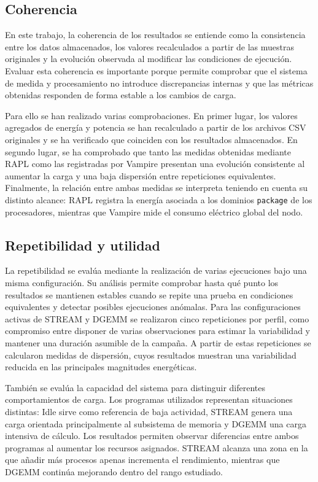 \subsection{Coherencia}

En este trabajo, la coherencia de los resultados se entiende como la consistencia entre los datos almacenados, los valores recalculados a partir de las muestras originales y la evolución observada al modificar las condiciones de ejecución. Evaluar esta coherencia es importante porque permite comprobar que el sistema de medida y procesamiento no introduce discrepancias internas y que las métricas obtenidas responden de forma estable a los cambios de carga.

Para ello se han realizado varias comprobaciones. En primer lugar, los valores agregados de energía y potencia se han recalculado a partir de los archivos CSV originales y se ha verificado que coinciden con los resultados almacenados. En segundo lugar, se ha comprobado que tanto las medidas obtenidas mediante RAPL como las registradas por Vampire presentan una evolución consistente al aumentar la carga y una baja dispersión entre repeticiones equivalentes. Finalmente, la relación entre ambas medidas se interpreta teniendo en cuenta su distinto alcance: RAPL registra la energía asociada a los dominios \texttt{package} de los procesadores, mientras que Vampire mide el consumo eléctrico global del nodo.

\subsection{Repetibilidad y utilidad}

La repetibilidad se evalúa mediante la realización de varias ejecuciones bajo una misma configuración. Su análisis permite comprobar hasta qué punto los resultados se mantienen estables cuando se repite una prueba en condiciones equivalentes y detectar posibles ejecuciones anómalas. Para las configuraciones activas de STREAM y DGEMM se realizaron cinco repeticiones por perfil, como compromiso entre disponer de varias observaciones para estimar la variabilidad y mantener una duración asumible de la campaña. A partir de estas repeticiones se calcularon medidas de dispersión, cuyos resultados muestran una variabilidad reducida en las principales magnitudes energéticas.

También se evalúa la capacidad del sistema para distinguir diferentes comportamientos de carga. Los programas utilizados representan situaciones distintas: Idle sirve como referencia de baja actividad, STREAM genera una carga orientada principalmente al subsistema de memoria y DGEMM una carga intensiva de cálculo. Los resultados permiten observar diferencias entre ambos programas al aumentar los recursos asignados. STREAM alcanza una zona en la que añadir más procesos apenas incrementa el rendimiento, mientras que DGEMM continúa mejorando dentro del rango estudiado.

